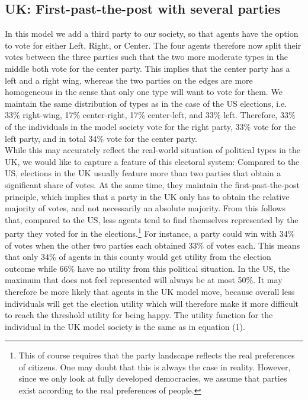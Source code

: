 \documentclass[12pt, a4paper]{article}
\begin{document}
\subsection{UK: First-past-the-post with several parties}
In this model we add a third party to our society, so that agents have the option to vote for either Left, Right, or Center. The four agents therefore now split their votes between the three parties such that the two more moderate types in the middle both vote for the center party. This implies that the center party has a left and a right wing, whereas the two parties on the edges are more homogeneous in the sense that only one type will want to vote for them. We maintain the same distribution of types as in the case of the US elections, i.e. 33\% right-wing, 17\% center-right, 17\% center-left, and 33\% left. Therefore, 33\% of the individuals in the model society vote for the right party, 33\% vote for the left party, and in total 34\% vote for the center party. \\
While this may accurately reflect the real-world situation of political types in the UK, we would like to capture a feature of this electoral system: Compared to the US, elections in the UK usually feature more than two parties that obtain a significant share of votes. At the same time, they maintain the first-past-the-post principle, which implies that a party in the UK only has to obtain the relative majority of votes, and not necessarily an absolute majority. From this follows that, compared to the US, less agents tend to find themselves represented by the party they voted for in the elections.\footnote{This of course requires that the party landscape reflects the real preferences of citizens. One may doubt that this is always the case in reality. However, since we only look at fully developed democracies, we assume that parties exist according to the real preferences of people.} For instance, a party could win with 34\% of votes when the other two parties each obtained 33\% of votes each. This means that only 34\% of agents in this county would get utility from the election outcome while 66\% have no utility from this political situation. In the US, the maximum that does not feel represented will always be at most 50\%. It may therefore be more likely that agents in the UK model move, because overall less individuals will get the election utility which will therefore make it more difficult to reach the threshold utility for being happy.
The utility function for the individual in the UK model society is the same as in equation (1).
\end{document}
